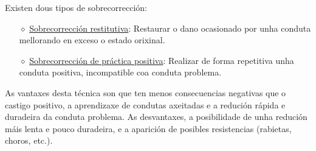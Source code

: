 \documentclass[a4paper,11pt]{article}
\begin{document}
Existen dous tipos de sobrecorrección:
\begin{itemize}
	\item[$\diamond$] \underline{Sobrecorrección restitutiva}: Restaurar o dano ocasionado por unha 
	conduta mellorando en exceso o estado orixinal.
	\item[$\diamond$] \underline{Sobrecorrección de práctica positiva}: Realizar de forma repetitiva 
	unha conduta positiva, incompatible coa conduta problema.
\end{itemize}

As vantaxes desta técnica son que ten menos consecuencias negativas que o castigo positivo, a aprendizaxe de condutas axeitadas e a redución rápida e duradeira da conduta problema. As desvantaxes, a posibilidade de unha redución máis lenta e pouco duradeira, e a aparición de posibles resistencias (rabietas, choros, etc.).
\end{document}
